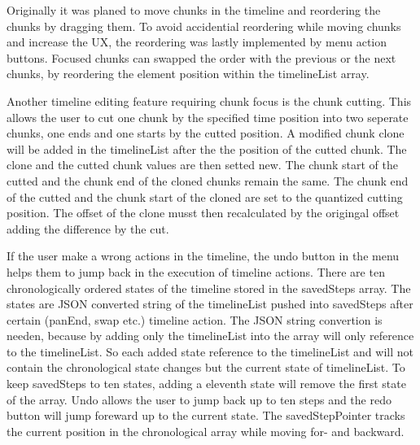 \documentclass[conference]{IEEEtran}
\begin{document}
Originally it was planed to move chunks in the timeline and reordering the chunks by dragging them. To avoid accidential reordering while moving chunks and increase the UX, the reordering was lastly implemented by menu action buttons. Focused chunks can swapped the order with the previous or the next chunks, by reordering the element position within the timelineList array. 

Another timeline editing feature requiring chunk focus is the chunk cutting. This allows the user to cut one chunk by the specified time position into two seperate chunks, one ends and one starts by the cutted position. A modified chunk clone will be added in the timelineList after the the position of the cutted chunk. The clone and the cutted chunk values are then setted new. The chunk start of the cutted and the chunk end of the cloned chunks remain the same. The chunk end of the cutted and the chunk start of the cloned are set to the quantized cutting position. The offset of the clone musst then recalculated by the origingal offset adding the difference by the cut. 

If the user make a wrong actions in the timeline, the undo button in the menu helps them to jump back in the execution of timeline actions. There are ten chronologically ordered states of the timeline stored in the savedSteps array. The states are JSON converted string of the timelineList pushed into savedSteps after certain (panEnd, swap etc.) timeline action. The JSON string convertion is needen, because by adding only the timelineList into the array will only reference to the timelineList. So each added state reference to the timelineList and will not contain the chronological state changes but the current state of timelineList. To keep savedSteps to ten states, adding a eleventh state will remove the first state of the array. Undo allows the user to jump back up to ten steps and the redo button will jump foreward up to the current state. The savedStepPointer tracks the current position in the chronological array while moving for- and backward. \\
\end{document}
